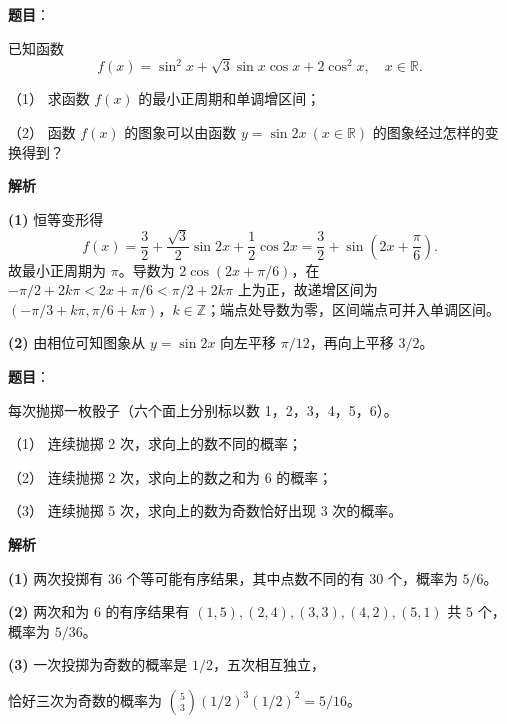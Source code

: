 \begin{answer}

\textbf{题目}：

已知函数
\nopagebreak[4]
\[
f(x)=\sin^2 x+\sqrt{3}\sin x\cos x+2\cos^2 x,\quad x\in\mathbb{R}.
\]

（1） 求函数 $f(x)$ 的最小正周期和单调增区间；

（2） 函数 $f(x)$ 的图象可以由函数 $y=\sin 2x\ (x\in\mathbb{R})$ 的图象经过怎样的变换得到？

\textbf{解析}

\textbf{(1)} 恒等变形得
\nopagebreak[4]
\[
f(x)=\frac32+\frac{\sqrt3}{2}\sin2x+\frac12\cos2x
=\frac32+\sin\left(2x+\frac\pi6\right).
\]
故最小正周期为 $\pi$。导数为 $2\cos(2x+\pi/6)$，在 $-\pi/2+2k\pi<2x+\pi/6<\pi/2+2k\pi$ 上为正，故递增区间为 $(-\pi/3+k\pi,\pi/6+k\pi)$，$k\in\mathbb Z$；端点处导数为零，区间端点可并入单调区间。

\textbf{(2)} 由相位可知图象从 $y=\sin2x$ 向左平移 $\pi/12$，再向上平移 $3/2$。



\end{answer}
\begin{answer}

\textbf{题目}：

每次抛掷一枚骰子（六个面上分别标以数 1，2，3，4，5，6）。

（1） 连续抛掷 2 次，求向上的数不同的概率；

（2） 连续抛掷 2 次，求向上的数之和为 6 的概率；

（3） 连续抛掷 5 次，求向上的数为奇数恰好出现 3 次的概率。

\textbf{解析}

\textbf{(1)} 两次投掷有 $36$ 个等可能有序结果，其中点数不同的有 $30$ 个，概率为 $5/6$。

\textbf{(2)} 两次和为 $6$ 的有序结果有 $(1,5),(2,4),(3,3),(4,2),(5,1)$ 共 $5$ 个，概率为 $5/36$。

\textbf{(3)} 一次投掷为奇数的概率是 $1/2$，五次相互独立，

恰好三次为奇数的概率为 $\binom53(1/2)^3(1/2)^2=5/16$。




\end{answer}
